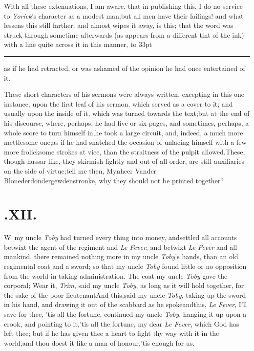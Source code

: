 \documentclass{article}
\begin{document}
With all these extenuations, I am aware, that in publishing
this, I do no service to \textit{Yorick}’s character as a
modest man;\tsk but all men have their failings! and what lessens
this still farther, and almost wipes it away, is this; that the
word was struck through sometime afterwards (as appears from a
different tint of the ink) with a line quite across it in this manner,
\hbox to 33pt{\leaders\hrule width 1pt height 3.4pt depth -3.1pt\hfill}\tsh as if he had retracted, or was
ashamed of the opinion he had once entertained of it.

These short characters of his sermons were always written,
excepting in this one instance, upon the first leaf of his sermon,
which served as a cover to it; and usually upon the inside of it,
which was turned towards the text;\tsk but at the end of his
discourse, where, perhaps, he had five or six pages, and sometimes,
perhaps, a whole score to turn himself in,\tsk he took a large
circuit, and, indeed, a much more mettlesome one;\tsk as if he
had snatched the occasion of unlacing himself with a few more
frolicksome strokes at vice, than the straitness of the pulpit
allowed.\tsk These, though hussar-like, they skirmish lightly and
out of all order, are still auxiliaries on the side of
virtue;\tsk tell me then, Mynheer Vander
Blonederdondergewdenstronke, why they should not be printed
together?

\vfill{}\eject
\section{.\enspace XII.}

\lettrine{W}{\,} my uncle \textit{Toby} had turned
every thing into money, and\break settled all accounts betwixt the agent
of the regiment and \textit{Le Fever}, and betwixt \textit{Le Fever}
and all mankind,\tsh\break
there remained nothing more in my uncle \textit{Toby}’s hands, than an old
regimental coat and a sword; so that my uncle \textit{Toby} found little or no
opposition from the world in taking administration. The coat my uncle \textit{Toby}
gave the corporal;\break
\tsh Wear it, \textit{Trim}, said my uncle \textit{Toby}, as long
as it will hold together, for the sake of the poor lieutenant\tsh And this,\tsh said
my uncle \textit{Toby}, taking up the sword in his hand, and drawing it out of the
scabbard as he spoke\tsk and\break this, \textit{Le Fever}, I’ll save for thee,\tsk
’tis all the fortune, continued my uncle \textit{Toby}, hanging it up upon a
crook, and pointing to it,\tsk ’tis all the fortune, my dear \textit{Le Fever},
which God has left thee; but if he has given thee a heart to fight thy way with it
in the world,\tsk and thou doest it like a man of honour,\tsk ’tis enough for us.
\end{document}
